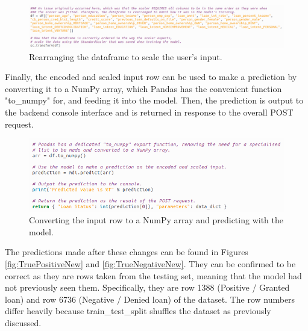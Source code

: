 \documentclass[12pt]{report}
\begin{document}
\begin{figure}[H]
    \centering
    \includegraphics[width=\linewidth]{Implementation/JAN 10 UPDATES/DFRearrangeScale.png}
    \caption{Rearranging the dataframe to scale the user's input.}
    \label{fig:DFRearrangeScale}
\end{figure}

\noindent Finally, the encoded and scaled input row can be used to make a prediction by converting it to a NumPy array, which 
Pandas has the convenient function "to\_numpy" for, and feeding it into the model. Then, the prediction is output to the 
backend console interface and is returned in response to the overall POST request.

\begin{figure}[H]
    \centering
    \includegraphics[width=\linewidth]{Implementation/JAN 10 UPDATES/NewUviPredict.png}
    \caption{Converting the input row to a NumPy array and predicting with the model.}
    \label{fig:NewUviPredict}
\end{figure}

\noindent The predictions made after these changes can be found in Figures \ref{fig:TruePositiveNew} and \ref{fig:TrueNegativeNew}. 
They can be confirmed to be correct as they are rows taken from the testing set, meaning that the model had not previously seen them. 
Specifically, they are row 1388 (Positive / Granted loan) and row 6736 (Negative / Denied loan) of the dataset.
The row numbers differ heavily because train\_test\_split shuffles the dataset as previously discussed.
\end{document}
